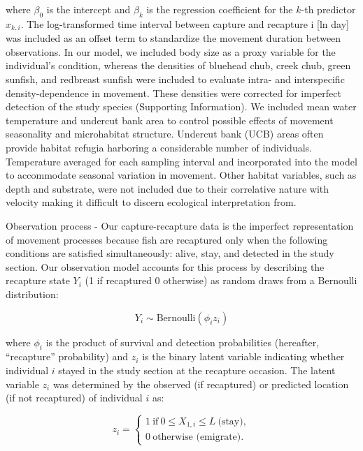 \documentclass[11pt, class=article, crop=false]{standalone}
\begin{document}
where $\beta_0$ is the intercept and $\beta_k$ is the regression coefficient for the $k$-th predictor $x_{k,i}$. The log-transformed time interval between capture and recapture i [ln day] was included as an offset term to standardize the movement duration between observations. In our model, we included body size as a proxy variable for the individual’s condition, whereas the densities of bluehead chub, creek chub, green sunfish, and redbreast sunfish were included to evaluate intra- and interspecific density-dependence in movement. These densities were corrected for imperfect detection of the study species (Supporting Information). We included mean water temperature and undercut bank area to control possible effects of movement seasonality and microhabitat structure. Undercut bank (UCB) areas often provide habitat refugia harboring a considerable number of individuals. Temperature averaged for each sampling interval and incorporated into the model to accommodate seasonal variation in movement. Other habitat variables, such as depth and substrate, were not included due to their correlative nature with velocity making it difficult to discern ecological interpretation from. 

Observation process - Our capture-recapture data is the imperfect representation of movement processes because fish are recaptured only when the following conditions are satisfied simultaneously: alive, stay, and detected in the study section. Our observation model accounts for this process by describing the recapture state $Y_i$ (1 if recaptured 0 otherwise) as random draws from a Bernoulli distribution:

\begin{equation}
    Y_i \sim \text{Bernoulli}(\phi_i z_i)
\end{equation}

where $\phi_i$ is the product of survival and detection probabilities (hereafter, ``recapture'' probability) and $z_i$ is the binary latent variable indicating whether individual $i$ stayed in the study section at the recapture occasion.
The latent variable $z_i$ was determined by the observed (if recaptured) or predicted location (if not recaptured) of individual $i$ as: 

\begin{equation}
    z_i =
    \begin{cases}
        1~\text{if}~0 \le X_{1,i} \le L~\text{(stay)},\\
        0~\text{otherwise (emigrate)}.
    \end{cases}
\end{equation}
\end{document}
